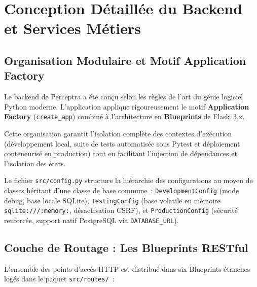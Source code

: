 \chapter{Conception Détaillée du Backend et Services Métiers}
\label{chap:backend}

\section{Organisation Modulaire et Motif Application Factory}

Le backend de Perceptra a été conçu selon les règles de l'art du génie logiciel Python moderne. L'application applique rigoureusement le motif \textbf{Application Factory} (\texttt{create\_app}) combiné à l'architecture en \textbf{Blueprints} de Flask~3.x.

Cette organisation garantit l'isolation complète des contextes d'exécution (développement local, suite de tests automatisée sous Pytest et déploiement conteneurisé en production) tout en facilitant l'injection de dépendances et l'isolation des états.

Le fichier \texttt{src/config.py} structure la hiérarchie des configurations au moyen de classes héritant d'une classe de base commune~: \texttt{DevelopmentConfig} (mode debug, base locale SQLite), \texttt{TestingConfig} (base volatile en mémoire \texttt{sqlite:///:memory:}, désactivation CSRF), et \texttt{ProductionConfig} (sécurité renforcée, support natif PostgreSQL via \texttt{DATABASE\_URL}).

\section{Couche de Routage : Les Blueprints RESTful}

L'ensemble des points d'accès HTTP est distribué dans six Blueprints étanches logés dans le paquet \texttt{src/routes/}~:


